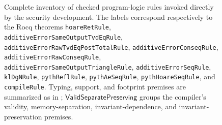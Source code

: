 \begin{figure}[!t]
\caption{Complete inventory of checked program-logic rules invoked directly
by the security development.
The labels correspond respectively to the Rocq theorems
\nolinkurl{hoareRetRule}, \nolinkurl{additiveErrorSameOutputTvdEqRule},
\nolinkurl{additiveErrorRawTvdEqPostTotalRule},
\nolinkurl{additiveErrorConseqRule}, \nolinkurl{additiveErrorRawConseqRule},
\nolinkurl{additiveErrorSameOutputTriangleRule},
\nolinkurl{additiveErrorSeqRule}, \nolinkurl{klDgNRule},
\nolinkurl{pythReflRule}, \nolinkurl{pythAeSeqRule},
\nolinkurl{pythHoareSeqRule}, and \nolinkurl{compileRule}.
Typing, support, and footprint premises are summarized as in
; \(\mathsf{ValidSeparatePreserving}\) groups the
compiler's validity, memory-separation, invariant-dependence, and
invariant-preservation premises.}
\label{fig:security-rule-inventory}
\end{figure}
\FloatBarrier
